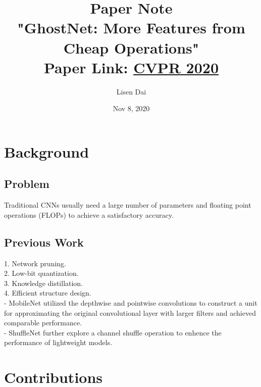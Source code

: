 \documentclass[12pt]{article}
\title{
    {Paper Note}\\
    {\large "GhostNet: More Features from Cheap Operations"} \\
    {\small Paper Link: \href{https://arxiv.org/pdf/1911.11907.pdf}{CVPR 2020}}
}
\author{Lisen Dai}
\date{Nov 8, 2020}
\begin{document}
    \maketitle
    \section{
        Background
    }
        \subsection{
            Problem
        }
            Traditional CNNs usually need a large number of parameters and floating point operations (FLOPs) to achieve a satisfactory accuracy. \\
        \subsection{
            Previous Work
        }
            1. Network pruning. \\
            2. Low-bit quantization. \\
            3. Knowledge distillation. \\
            4. Efficient structure design. \\
            \quad - MobileNet utilized the depthwise and pointwise convolutions to construct a unit for approximating the original convolutional layer with larger filters and achieved comparable performance. \\
            \quad - ShuffleNet further explore a channel shuffle operation to enhence the performance of lightweight models. \\

    \section{
        Contributions 
    }
\end{document}
